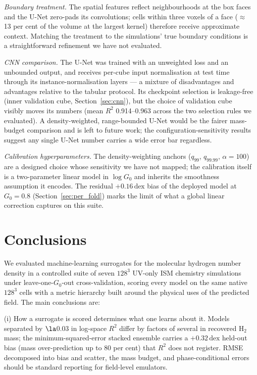 \documentclass[fleqn,usenatbib]{rasti}
\newcommand{\Gzero}{G_0}
\newcommand{\dex}{\,\text{dex}}
\newcommand{\Rsq}{R^2}
\begin{document}
\textit{Boundary treatment.} The spatial features reflect
neighbourhoods at the box faces and the U-Net zero-pads its
convolutions; cells within three voxels of a face (\(\approx\)13 per cent
of the volume at the largest kernel) therefore receive approximate
context. Matching the treatment to the simulations' true boundary
conditions is a straightforward refinement we have not evaluated.

\textit{CNN comparison.} The U-Net was trained with an unweighted loss
and an unbounded output, and receives per-cube input normalisation at
test time through its instance-normalisation layers --- a mixture of
disadvantages and advantages relative to the tabular protocol. Its
checkpoint selection is leakage-free (inner validation cube,
Section~\ref{sec:cnn}), but the choice of validation cube visibly moves
its numbers (mean \(\Rsq\) 0.914--0.963 across the two selection rules
we evaluated). A density-weighted,
range-bounded U-Net would be the fairer mass-budget comparison and is
left to future work; the configuration-sensitivity results suggest any
single U-Net number carries a wide error bar regardless.

\textit{Calibration hyperparameters.} The density-weighting anchors
(\(q_{99}\), \(q_{99.99}\), \(\alpha = 100\)) are a designed choice whose
sensitivity we have not mapped; the calibration itself is a
two-parameter linear model in \(\log\Gzero\) and inherits the smoothness
assumption it encodes. The residual \(+0.16\dex\) bias of the deployed
model at \(\Gzero = 0.8\) (Section~\ref{sec:per_fold}) marks the
limit of what a global linear correction captures on this suite.

\section{Conclusions}
\label{sec:conc}

We evaluated machine-learning surrogates for the molecular hydrogen
number density in a controlled suite of seven \(128^3\) UV-only ISM
chemistry simulations under leave-one-\(\Gzero\)-out cross-validation,
scoring every model on the same native \(128^3\) cells with a metric
hierarchy built around the physical uses of the predicted field.
The main conclusions are:

(i) How a surrogate is scored determines what one learns about it.
Models separated by \(\la\)0.03 in log-space \(\Rsq\) differ by factors of
several in recovered H\(_2\) mass; the minimum-squared-error stacked
ensemble carries a \(+0.32\dex\) held-out bias (mass over-prediction up
to 80 per cent) that \(\Rsq\) does not register. RMSE decomposed into
bias and scatter, the mass budget, and phase-conditional errors should
be standard reporting for field-level emulators.
\end{document}
